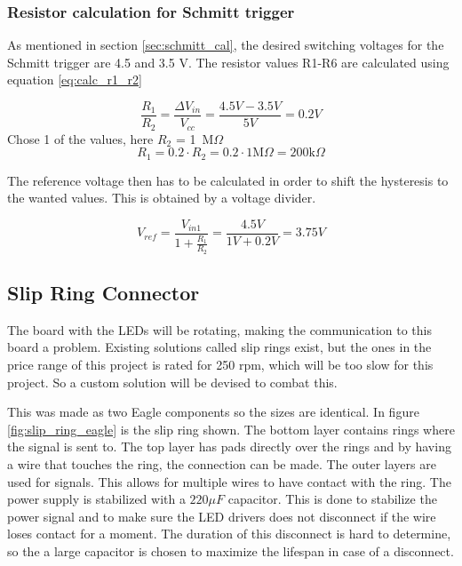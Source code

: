 \subsubsection*{Resistor calculation for Schmitt trigger}
As mentioned in section \ref{sec:schmitt_cal}, the desired switching voltages for the Schmitt trigger are 4.5 and 3.5 V.
The resistor values R1-R6 are calculated using equation \ref{eq:calc_r1_r2}\cite{book:prac_ele}

\begin{equation}\label{eq:calc_r1_r2}
 \frac{R_1}{R_2} = \frac{\Delta V_{in}}{V_{cc}} = \frac{4.5V-3.5V}{5V} = 0.2V
\end{equation}
Chose 1 of the values, here $R_2$ = 1\ M$\Omega$
\begin{equation}
 R_1 = 0.2\cdot R_2 = 0.2\cdot 1 \text{M} \Omega = 200 \text{k}\Omega
\end{equation}

The reference voltage then has to be calculated in order to shift the hysteresis to the wanted values.
This is obtained by a voltage divider.

\begin{equation}
 V_{ref} = \frac{V_{in1}}{1+\frac{R_1}{R_2}} = \frac{4.5V}{1V+0.2V} = 3.75 V
\end{equation}

\subsection{Slip Ring Connector}\label{sec:ring_connector}
The board with the LEDs will be rotating, making the communication to this board a problem.
Existing solutions called slip rings exist, but the ones in the price range of this project is rated for 250 rpm, which will be too slow for this project.
So a custom solution will be devised to combat this.

This was made as two Eagle components so the sizes are identical.
In figure \ref{fig:slip_ring_eagle} is the slip ring shown.
The bottom layer contains rings where the signal is sent to.
The top layer has pads directly over the rings and by having a wire that touches the ring, the connection can be made.
The outer layers are used for signals.
This allows for multiple wires to have contact with the ring.
The power supply is stabilized with a $220 \mu F$ capacitor.
This is done to stabilize the power signal and to make sure the LED drivers does not disconnect if the wire loses contact for a moment.
The duration of this disconnect is hard to determine, so the a large capacitor is chosen to maximize the lifespan in case of a disconnect.

